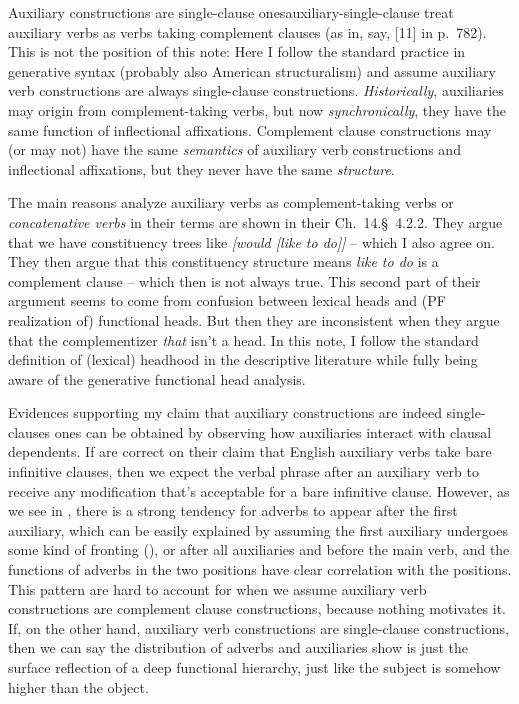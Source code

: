 \documentclass[UTF8, a4paper, oneside, scheme=plain, 12pt]{ctexbook}
\newcommand*{\citesec}[1]{\S~{#1}}
\newcommand*{\citechap}[1]{Ch.~{#1}}
\newcommand*{\citepage}[1]{p.~{#1}}
\newcommand*{\citechapsec}[2]{\citechap{#1}.\citesec{#2}}
\newcommand*{\term}[1]{\emph{#1}}
\newcommand{\form}[1]{\emph{#1}}
\begin{document}
\begin{infobox}{Auxiliary constructions are single-clause ones}{auxiliary-single-clause}
    \citet{cgel} treat auxiliary verbs as verbs taking complement clauses 
    (as in, say, [11] in \citepage{782}).
    This is not the position of this note:
    Here I follow the standard practice in generative syntax (probably also American structuralism) 
    and assume auxiliary verb constructions are always single-clause constructions.
    \emph{Historically}, auxiliaries may origin from complement-taking verbs,
    but now \emph{synchronically}, they have the same function of inflectional affixations.
    Complement clause constructions may (or may not) have the same \emph{semantics} of 
    auxiliary verb constructions and inflectional affixations,
    but they never have the same \emph{structure}.

    The main reasons \citet{cgel} analyze auxiliary verbs as complement-taking verbs or
    \term{concatenative verbs} in their terms 
    are shown in their \citechapsec{14}{4.2.2}.
    They argue that we have constituency trees like
    \form{[would [like to do]]} -- which I also agree on.
    They then argue that this constituency structure means 
    \form{like to do} is a complement clause -- which then is not always true.
    This second part of their argument 
    seems to come from confusion between lexical heads and (PF realization of) functional heads.
    But then they are inconsistent when they argue that 
    the complementizer \form{that} isn't a head.
    In this note, I follow the standard definition of (lexical) headhood in the descriptive literature
    while fully being aware of the generative functional head analysis.

    Evidences supporting my claim that auxiliary constructions are indeed single-clauses ones 
    can be obtained by observing how auxiliaries interact with clausal dependents.
    If \citet{cgel} are correct on their claim that English auxiliary verbs take bare infinitive clauses,
    then we expect the verbal phrase after an auxiliary verb to receive any modification 
    that's acceptable for a bare infinitive clause.
    However, as we see in ,
    there is a strong tendency for adverbs to appear after the first auxiliary,
    which can be easily explained by assuming the first auxiliary 
    undergoes some kind of fronting (),
    or after all auxiliaries and before the main verb,
    and the functions of adverbs in the two positions 
    have clear correlation with the positions.
    This pattern are hard to account for 
    when we assume auxiliary verb constructions are complement clause constructions,
    because nothing motivates it.
    If, on the other hand, 
    auxiliary verb constructions are single-clause constructions,
    then we can say the distribution of adverbs and auxiliaries
    show is just the surface reflection of a deep functional hierarchy,
    just like the subject is somehow higher than the object.
\end{infobox}
\end{document}
